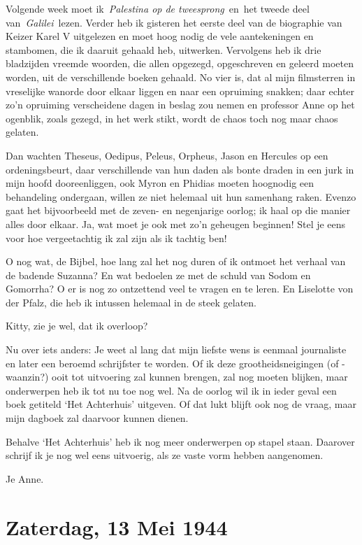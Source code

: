 \documentclass{book}
\begin{document}
Volgende week moet ik~\emph{Palestina op de tweesprong}~en~het tweede deel
van~\emph{Galilei}~lezen. Verder heb ik gisteren het eerste deel van de
biographie van Keizer Karel V uitgelezen en moet hoog nodig de vele
aantekeningen en stambomen, die ik daaruit gehaald heb, uitwerken.  Vervolgens
heb ik drie bladzijden vreemde woorden, die allen opgezegd, opgeschreven en
geleerd moeten worden, uit de verschillende boeken gehaald. No vier is, dat al
mijn filmsterren in vreselijke wanorde door elkaar liggen en naar een opruiming
snakken; daar echter zo'n opruiming verscheidene dagen in beslag zou nemen en
professor Anne op het ogenblik, zoals gezegd, in het werk stikt, wordt de chaos
toch nog maar chaos gelaten.

Dan wachten Theseus, Oedipus, Peleus, Orpheus, Jason en Hercules op een
ordeningsbeurt, daar verschillende van hun daden als bonte draden in een jurk in
mijn hoofd dooreenliggen, ook Myron en Phidias moeten hoognodig een behandeling
ondergaan, willen ze niet helemaal uit hun samenhang raken. Evenzo gaat het
bijvoorbeeld met de zeven- en negenjarige oorlog; ik haal op die manier alles
door elkaar. Ja, wat moet je ook met zo'n geheugen beginnen! Stel je eens voor
hoe vergeetachtig ik zal zijn als ik tachtig ben!

O nog wat, de Bijbel, hoe lang zal het nog duren of ik ontmoet het verhaal van
de badende Suzanna? En wat bedoelen ze met de schuld van Sodom en Gomorrha? O er
is nog zo ontzettend veel te vragen en te leren.  En Liselotte von der Pfalz,
die heb ik intussen helemaal in de steek gelaten.

Kitty, zie je wel, dat ik overloop?

Nu over iets anders: Je weet al lang dat mijn liefste wens is eenmaal
journaliste en later een beroemd schrijfster te worden. Of ik deze
grootheidsneigingen (of - waanzin?) ooit tot uitvoering zal kunnen brengen, zal
nog moeten blijken, maar onderwerpen heb ik tot nu toe nog wel. Na de oorlog wil
ik in ieder geval een boek getiteld `Het Achterhuis' uitgeven. Of dat lukt
blijft ook nog de vraag, maar mijn dagboek zal daarvoor kunnen dienen.

Behalve `Het Achterhuis' heb ik nog meer onderwerpen op stapel staan.  Daarover
schrijf ik je nog wel eens uitvoerig, als ze vaste vorm hebben aangenomen.

Je Anne.

\section*{Zaterdag, 13 Mei 1944}
\end{document}
